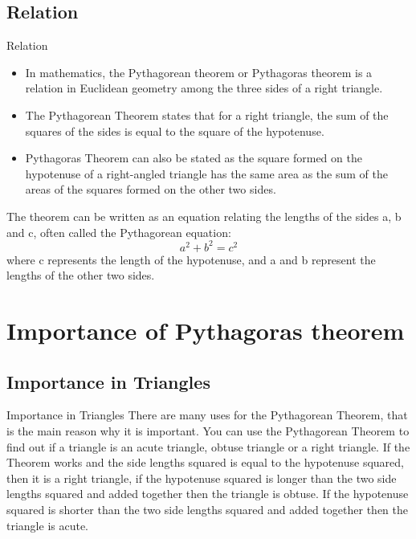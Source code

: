 \documentclass[10pt]{beamer}
\begin{document}
\subsection{Relation}
\begin{frame}{Relation}
\transfade
	\begin{itemize}
	\item In mathematics, the Pythagorean theorem or Pythagoras theorem is a relation in Euclidean geometry among the three sides of a right triangle.
	\pause
	\item The Pythagorean Theorem states that for a right triangle, the sum of the squares of the sides is equal to the square of the hypotenuse. 
	\pause
	\item Pythagoras Theorem can also be stated as the square formed on the hypotenuse of a right-angled triangle has the same area as the sum of the areas of the squares formed on the other two sides.
	\end{itemize}
 The theorem can be written as an equation relating the lengths of the sides a, b and c, often called the Pythagorean equation:
\begin{equation}
\label{one}
a^2+b^2=c^2
\end{equation}
where c represents the length of the hypotenuse, and a and b represent the lengths of the other two sides.
\end{frame}

\section{Importance of Pythagoras theorem}
\label{sec:importance}
\subsection{Importance in Triangles}
\begin{frame}{Importance in Triangles}
\transfade
There are many uses for the Pythagorean Theorem, that is the main reason why it is important. You can use the Pythagorean Theorem to find out if a triangle is an acute triangle, obtuse triangle or a right triangle. If the Theorem works and the side lengths squared is equal to the hypotenuse squared, then it is a right triangle, if the hypotenuse squared is longer than the two side lengths squared and added together then the triangle is obtuse. If the hypotenuse squared is shorter than the two side lengths squared and added together then the triangle is acute.
\end{frame}
\end{document}
